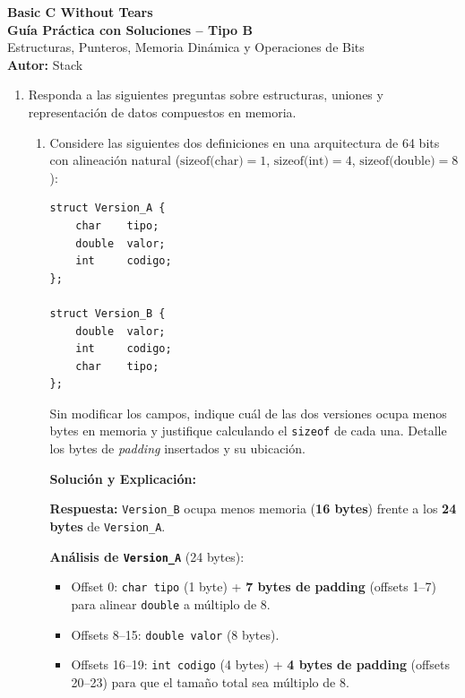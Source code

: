 \documentclass[11pt,letterpaper]{article}
\begin{document}
\begin{center}
    {\LARGE \textbf{Basic C Without Tears}} \\[0.2cm]
    {\Large \textbf{Guía Práctica con Soluciones -- Tipo B}} \\[0.12cm]
    \small Estructuras, Punteros, Memoria Dinámica y Operaciones de Bits \\[0.08cm]
    \textbf{Autor:} Stack
\end{center}
\vspace{0.2cm}

\begin{enumerate}[label=\textbf{\arabic*.}]
    \item Responda a las siguientes preguntas sobre estructuras, uniones y representación de datos compuestos en memoria.

    \begin{enumerate}[label=(\alph*)]
        \item Considere las siguientes dos definiciones en una arquitectura de 64 bits con alineación natural ($\text{sizeof(char)} = 1$, $\text{sizeof(int)} = 4$, $\text{sizeof(double)} = 8$):
        \begin{lstlisting}[style=customc, numbers=none]
struct Version_A {
    char    tipo;
    double  valor;
    int     codigo;
};

struct Version_B {
    double  valor;
    int     codigo;
    char    tipo;
};
        \end{lstlisting}
        Sin modificar los campos, indique cuál de las dos versiones ocupa menos bytes en memoria y justifique calculando el \texttt{sizeof} de cada una. Detalle los bytes de \textit{padding} insertados y su ubicación.

        \begin{solucionbox}
        \textbf{Solución y Explicación:}

        \noindent \textbf{Respuesta:} \texttt{Version\_B} ocupa menos memoria (\textbf{16 bytes}) frente a los \textbf{24 bytes} de \texttt{Version\_A}.

        \noindent \textbf{Análisis de \texttt{Version\_A}} (24 bytes):
        \begin{itemize}[noitemsep]
            \item Offset 0: \texttt{char tipo} (1 byte) + \textbf{7 bytes de padding} (offsets 1--7) para alinear \texttt{double} a múltiplo de 8.
            \item Offsets 8--15: \texttt{double valor} (8 bytes).
            \item Offsets 16--19: \texttt{int codigo} (4 bytes) + \textbf{4 bytes de padding} (offsets 20--23) para que el tamaño total sea múltiplo de 8.
        \end{itemize}


\end{solucionbox}
\end{enumerate}
\end{enumerate}
\end{document}
